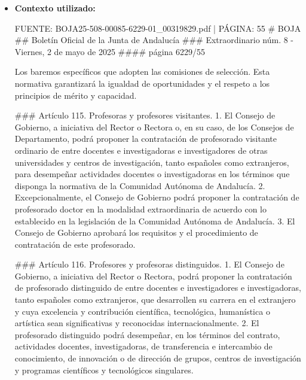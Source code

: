 \documentclass{article}
\begin{document}
\begin{itemize}
\begin{itemize}
                En cuanto a la edad, no se establece un límite máximo en la normativa proporcionada, pero es importante tener en cuenta que la Ley Orgánica 2/2023, de 22 de marzo, del Sistema Universitario, establece que la edad de jubilación para el personal docente e investigador es de 65 años. Sin embargo, esta edad puede variar dependiendo de la legislación y la normativa específica de cada universidad.

                En resumen, los requisitos esenciales para un solicitante español son la posesión de una titulación universitaria adecuada, experiencia docente y otros requisitos específicos que pueden variar dependiendo de la plaza y la convocatoria. Es importante consultar la normativa específica para cada plaza para obtener información precisa y actualizada.
          \item \textbf{Contexto utilizado:}
                \begin{scriptsize}
                  FUENTE: BOJA25-508-00085-6229-01\_00319829.pdf | PÁGINA: 55
                  \# BOJA
                  \#\# Boletín Oficial de la Junta de Andalucía
                  \#\#\# Extraordinario núm. 8 - Viernes, 2 de mayo de 2025
                  \#\#\#\# página 6229/55

                  Los baremos específicos que adopten las comisiones de selección. Esta normativa garantizará la igualdad de oportunidades y el respeto a los principios de mérito y capacidad.

                  \#\#\# Artículo 115. Profesoras y profesores visitantes.
                  1. El Consejo de Gobierno, a iniciativa del Rector o Rectora o, en su caso, de los Consejos de Departamento, podrá proponer la contratación de profesorado visitante ordinario de entre docentes e investigadoras e investigadores de otras universidades y centros de investigación, tanto españoles como extranjeros, para desempeñar actividades docentes o investigadoras en los términos que disponga la normativa de la Comunidad Autónoma de Andalucía.
                  2. Excepcionalmente, el Consejo de Gobierno podrá proponer la contratación de profesorado doctor en la modalidad extraordinaria de acuerdo con lo establecido en la legislación de la Comunidad Autónoma de Andalucía.
                  3. El Consejo de Gobierno aprobará los requisitos y el procedimiento de contratación de este profesorado.

                  \#\#\# Artículo 116. Profesores y profesoras distinguidos.
                  1. El Consejo de Gobierno, a iniciativa del Rector o Rectora, podrá proponer la contratación de profesorado distinguido de entre docentes e investigadores e investigadoras, tanto españoles como extranjeros, que desarrollen su carrera en el extranjero y cuya excelencia y contribución científica, tecnológica, humanística o artística sean significativas y reconocidas internacionalmente.
                  2. El profesorado distinguido podrá desempeñar, en los términos del contrato, actividades docentes, investigadoras, de transferencia e intercambio de conocimiento, de innovación o de dirección de grupos, centros de investigación y programas científicos y tecnológicos singulares.


\end{scriptsize}
\end{itemize}
\end{itemize}
\end{document}
